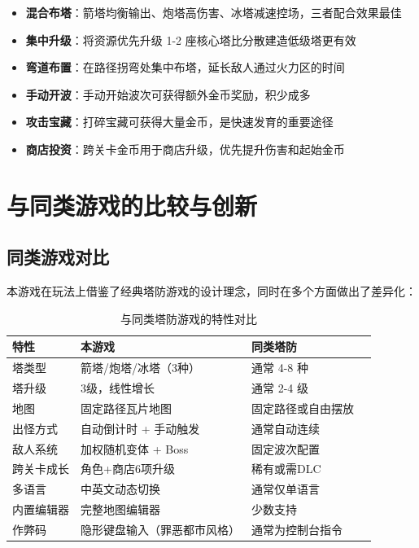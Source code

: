\documentclass[12pt,a4paper]{ctexart}
\begin{document}
\begin{itemize}
    \item \textbf{混合布塔}：箭塔均衡输出、炮塔高伤害、冰塔减速控场，三者配合效果最佳
    \item \textbf{集中升级}：将资源优先升级 1-2 座核心塔比分散建造低级塔更有效
    \item \textbf{弯道布置}：在路径拐弯处集中布塔，延长敌人通过火力区的时间
    \item \textbf{手动开波}：手动开始波次可获得额外金币奖励，积少成多
    \item \textbf{攻击宝藏}：打碎宝藏可获得大量金币，是快速发育的重要途径
    \item \textbf{商店投资}：跨关卡金币用于商店升级，优先提升伤害和起始金币
\end{itemize}


\section{与同类游戏的比较与创新}

\subsection{同类游戏对比}

本游戏在玩法上借鉴了经典塔防游戏的设计理念，同时在多个方面做出了差异化：

\begin{table}[H]
    \centering
    \caption{与同类塔防游戏的特性对比}
    \begin{tabularx}{\textwidth}{lXXX}
        \toprule
        \textbf{特性} & \textbf{本游戏} & \textbf{同类塔防} \\
        \midrule
        塔类型 & 箭塔/炮塔/冰塔（3种） & 通常 4-8 种 \\
        塔升级 & 3级，线性增长 & 通常 2-4 级 \\
        地图 & 固定路径瓦片地图 & 固定路径或自由摆放 \\
        出怪方式 & 自动倒计时 + 手动触发 & 通常自动连续 \\
        敌人系统 & 加权随机变体 + Boss & 固定波次配置 \\
        跨关卡成长 & 角色+商店6项升级 & 稀有或需DLC \\
        多语言 & 中英文动态切换 & 通常仅单语言 \\
        内置编辑器 & 完整地图编辑器 & 少数支持 \\
        作弊码 & 隐形键盘输入（罪恶都市风格） & 通常为控制台指令 \\
        \bottomrule
    \end{tabularx}
\end{table}
\end{document}
